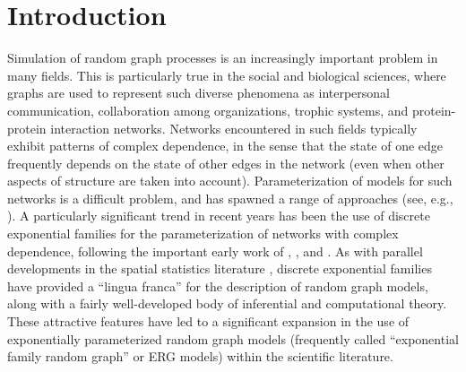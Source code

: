 \documentclass[11pt]{article}
\begin{document}


\section{Introduction}

Simulation of random graph processes is an increasingly important problem in many fields.  This is particularly true in the social and biological sciences, where graphs are used to represent such diverse phenomena as interpersonal communication, collaboration among organizations, trophic systems, and protein-protein interaction networks.  Networks encountered in such fields typically exhibit patterns of complex dependence, in the sense that the state of one edge frequently depends on the state of other edges in the network (even when other aspects of structure are taken into account).  Parameterization of models for such networks is a difficult problem, and has spawned a range of approaches (see, e.g., \citet{watts.strogatz:n:1998,barabasi.albert:s:1999,hoff.et.al:jasa:2002,newman:siamr:2003,skvoretz.et.al:sn:2004,butts:jms:2015}).  A particularly significant trend in recent years has been the use of discrete exponential families for the parameterization of networks with complex dependence, following the important early work of \citet{holland.leinhardt:jasa:1981} \citet{holland.et.al:sn:1983}, \citet{frank.strauss:jasa:1986}, and \citet{wasserman.pattison:p:1996}.  As with parallel developments in the spatial statistics literature \citep{besag:ts:1975,ripley:jrssB:1977,strauss:siam:1986}, discrete exponential families have provided a ``lingua franca'' for the description of random graph models, along with a fairly well-developed body of inferential and computational theory.  These attractive features have led to a significant expansion in the use of exponentially parameterized random graph models (frequently called ``exponential family random graph'' or ERG models) within the scientific literature.
\end{document}
